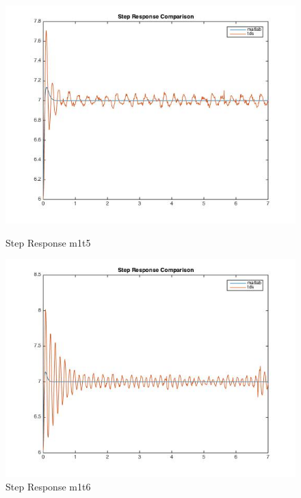 \documentclass[11pt,titlepage]{article}
\begin{document}
    \begin{figure}[H]
        \centering
        \begin{minipage}{.5\textwidth}
            \centering
            \includegraphics[scale=.3]{stepM1_T5}
            \caption{Step Response m1t5}
            \label{fig:stepM1_T5}
        \end{minipage}%
        \begin{minipage}{.5\textwidth}
            \centering
            \includegraphics[scale=.3]{stepM1_T6}
            \caption{Step Response m1t6}
            \label{fig:stepM1_T6}
        \end{minipage}%
    \end{figure}
\end{document}
